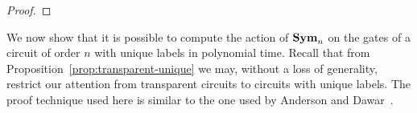 \documentclass[../paper.tex]{subfiles}
\begin{document}
\begin{proof}
  

  

\end{proof}

We now show that it is possible to compute the action of $\text{\textbf{Sym}}_n$ on the gates
of a circuit of order $n$ with unique labels in polynomial time. Recall that
from Proposition~\ref{prop:transparent-unique} we may, without a loss of
generality, restrict our attention from transparent circuits to circuits with
unique labels. The proof technique used here is similar to the one used by
Anderson and Dawar~\cite{AndersonD17}.
\end{document}
